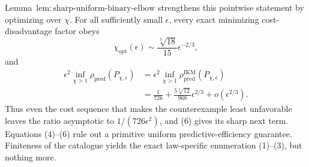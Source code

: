 Lemma~\(\mathrm{lem{:}sharp\text{-}uniform\text{-}binary\text{-}elbow}\) strengthens this pointwise statement by optimizing over \(\chi\). For all sufficiently small \(\epsilon\), every exact minimizing cost-disadvantage factor obeys
\[
 \chi_{\mathrm{opt}}(\epsilon)
 \sim\frac{\sqrt[3]{18}}{15}\epsilon^{-2/3},          \tag{5}
\]
and
\[
\begin{aligned}
 \epsilon^2\inf_{\chi>1}\rho_{\mathrm{pred}}(P_{\chi,\epsilon})
 &=\epsilon^2\inf_{\chi>1}\rho_{\mathrm{pred}}^{\mathrm{IKM}}(P_{\chi,\epsilon})\\
 &=\frac1{726}+\frac{5\sqrt[3]{12}}{968}\epsilon^{2/3}
 +o(\epsilon^{2/3}).                                  \tag{6}
\end{aligned}
\]
Thus even the cost sequence that makes the counterexample least unfavorable leaves the ratio asymptotic to \(1/(726\epsilon^2)\), and (6) gives its sharp next term. Equations (4)--(6) rule out a primitive uniform predictive-efficiency guarantee. Finiteness of the catalogue yields the exact law-specific enumeration (1)--(3), but nothing more.